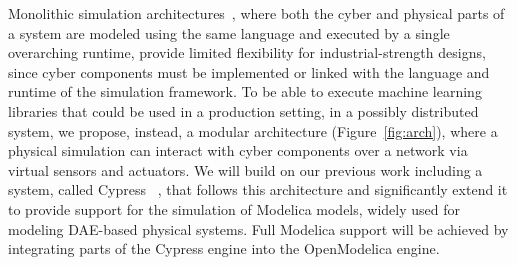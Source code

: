Monolithic simulation architectures~\cite{2017OpenModelica,2017WolframAnalysis,2017MapleSimSoftware,2017SimscapeSimulink}, where both the cyber and physical parts of a system are modeled using the same language and executed by a single overarching runtime, provide limited flexibility for industrial-strength designs, since cyber components must be implemented or linked with the language and runtime of the simulation framework.  
To be able to execute machine learning libraries that could be used in a production setting, in a possibly distributed system\cite{Goodfellow2015Cypress:Systems,Benzel2011TheExperimentation}, we propose, instead, a modular architecture (Figure~\ref{fig:arch}), where  
a physical simulation can interact with cyber components over a network via virtual sensors and actuators. 
We will build on our previous work including a system, called Cypress~ \cite{Goodfellow2015Cypress:Systems}, that follows this architecture and significantly extend it to provide support   
for the simulation of Modelica models, widely used for modeling DAE-based physical systems. Full Modelica support will be achieved by integrating  parts of the Cypress engine into the OpenModelica engine. 
